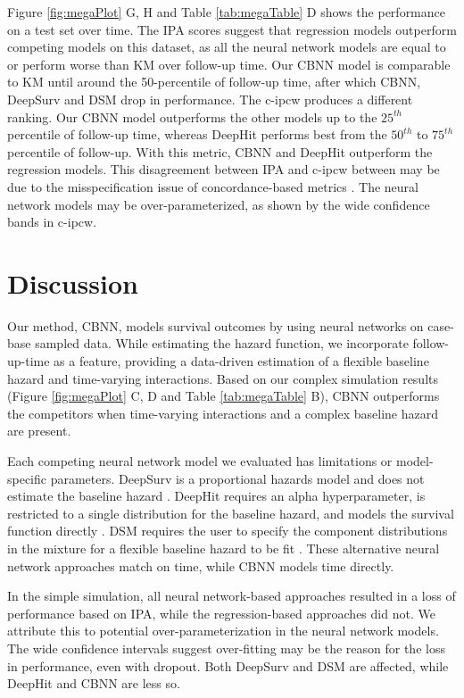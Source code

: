 \documentclass[AMA,STIX1COL,]{WileyNJD-v2}
\begin{document}
Figure \ref{fig:megaPlot} G, H and Table \ref{tab:megaTable} D shows the
performance on a test set over time. The IPA scores suggest that
regression models outperform competing models on this dataset, as all
the neural network models are equal to or perform worse than KM over
follow-up time. Our CBNN model is comparable to KM until around the
50-percentile of follow-up time, after which CBNN, DeepSurv and DSM drop
in performance. The c-ipcw produces a different ranking. Our CBNN model
outperforms the other models up to the \(25^{th}\) percentile of
follow-up time, whereas DeepHit performs best from the \(50^{th}\) to
\(75^{th}\) percentile of follow-up. With this metric, CBNN and DeepHit
outperform the regression models. This disagreement between IPA and
c-ipcw between may be due to the misspecification issue of
concordance-based metrics \citep{cindexfails2019}. The neural network
models may be over-parameterized, as shown by the wide confidence bands
in c-ipcw.

\hypertarget{discussion}{%
\section{Discussion}\label{discussion}}

Our method, CBNN, models survival outcomes by using neural networks on
case-base sampled data. While estimating the hazard function, we
incorporate follow-up-time as a feature, providing a data-driven
estimation of a flexible baseline hazard and time-varying interactions.
Based on our complex simulation results (Figure \ref{fig:megaPlot} C, D
and Table \ref{tab:megaTable} B), CBNN outperforms the competitors when
time-varying interactions and a complex baseline hazard are present.

Each competing neural network model we evaluated has limitations or
model-specific parameters. DeepSurv is a proportional hazards model and
does not estimate the baseline hazard \citep{katzman2018DeepSurv}.
DeepHit requires an alpha hyperparameter, is restricted to a single
distribution for the baseline hazard, and models the survival function
directly \citep{lee2018DeepHit}. DSM requires the user to specify the
component distributions in the mixture for a flexible baseline hazard to
be fit \citep{dsmPaper}. These alternative neural network approaches
match on time, while CBNN models time directly.

In the simple simulation, all neural network-based approaches resulted
in a loss of performance based on IPA, while the regression-based
approaches did not. We attribute this to potential over-parameterization
in the neural network models. The wide confidence intervals suggest
over-fitting may be the reason for the loss in performance, even with
dropout. Both DeepSurv and DSM are affected, while DeepHit and CBNN are
less so.
\end{document}
